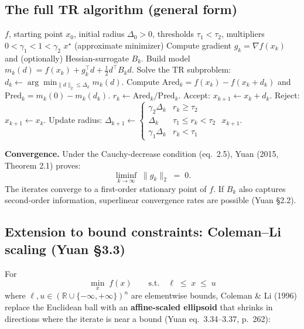 \documentclass[11pt,a4paper]{article}
\begin{document}
\subsection{The full TR algorithm (general form)}

\begin{algorithm}[H]
\caption{General Trust-Region Algorithm (Yuan 2015, \S 2)}
\begin{algorithmic}[1]
\Require $f$, starting point $x_0$, initial radius $\Delta_0 > 0$, thresholds $\tau_1 < \tau_2$, multipliers $0 < \gamma_1 < 1 < \gamma_2$
\Ensure $x^\star$ (approximate minimizer)
    \State Compute gradient $g_k = \nabla f(x_k)$ and (optionally) Hessian-surrogate $B_k$.
    \State Build model $m_k(d) = f(x_k) + g_k^\top d + \tfrac12 d^\top B_k d$.
    \State Solve the TR subproblem: $d_k \gets \arg\min_{\|d\|_2 \le \Delta_k} m_k(d)$.
    \State Compute $\text{Ared}_k = f(x_k) - f(x_k + d_k)$ and $\text{Pred}_k = m_k(0) - m_k(d_k)$.
    \State $r_k \gets \text{Ared}_k / \text{Pred}_k$.
        \State Accept: $x_{k+1} \gets x_k + d_k$.
    \Else
        \State Reject: $x_{k+1} \gets x_k$.
    \EndIf
    \State Update radius:
    $\Delta_{k+1} \gets \begin{cases}\gamma_2\Delta_k & r_k \ge \tau_2 \\ \Delta_k & \tau_1 \le r_k < \tau_2 \\ \gamma_1\Delta_k & r_k < \tau_1\end{cases}$
        \State \Return $x_{k+1}$.
    \EndIf
\EndFor
\end{algorithmic}
\end{algorithm}

\textbf{Convergence.} Under the Cauchy-decrease condition (eq.\ 2.5), Yuan (2015, Theorem 2.1) proves:
\[
\liminf_{k \to \infty}\;\|g_k\|_2 \;=\; 0.
\]
The iterates converge to a first-order stationary point of $f$. If $B_k$ also captures second-order information, superlinear convergence rates are possible (Yuan \S 2.2).

\subsection{Extension to bound constraints: Coleman--Li scaling (Yuan \S 3.3)}

For
\[
\min_{x}\; f(x) \qquad\text{s.t.}\quad \ell \;\le\; x \;\le\; u
\]
where $\ell, u \in (\mathbb{R} \cup \{-\infty, +\infty\})^n$ are elementwise bounds, Coleman \& Li (1996) replace the Euclidean ball with an \textbf{affine-scaled ellipsoid} that shrinks in directions where the iterate is near a bound (Yuan eq.\ 3.34--3.37, p.\ 262):
\end{document}
